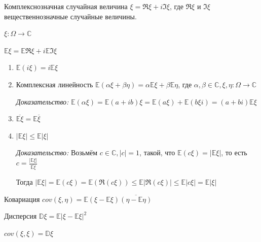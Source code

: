
\begin{definition}
    Комплекснозначная случайная величина $\xi = \Re \xi + i \Im \xi$, где $\Re \xi$ и $\Im \xi$
    вещественнозначные случайные величины.
\end{definition}

\begin{definition}
    $\xi : \Omega \to \mathbb{C}$

    $\mathbb{E} \xi = \mathbb{E} \Re \xi + i \mathbb{E} \Im \xi$
\end{definition}

\begin{properties}
    \begin{enumerate}
        \item {
            $\mathbb{E} (i \xi) = i \mathbb{E}\xi$
        }
        \item {
            Комплексная линейность $\mathbb{E} (\alpha \xi + \beta \eta) = \alpha \mathbb{E} \xi + \beta \mathbb{E} \eta$, где $\alpha, \beta \in \mathbb{C}, \xi, \eta : \Omega \to \mathbb{C}$

            \textit{Доказательство: } $\mathbb{E} (\alpha \xi) = \mathbb{E} (a + ib)\xi = \mathbb{E} (a \xi) + \mathbb{E} (b\xi i) = (a + bi) \mathbb{E} \xi$
        }
        \item {
            $\overline{\mathbb{E} \xi} = \mathbb{E} \overline{\xi}$
        }
        \item {
            $|\mathbb{E} \xi | \leqslant \mathbb{E} |\xi|$

            \textit{Доказательство: } Возьмём $c \in \mathbb{C}, |c| = 1$, такой, что $\mathbb{E} (c \xi) = |\mathbb{E} \xi|$, то есть $c = \frac{|\mathbb{E} \xi|}{\overline{\mathbb{E} \xi}}$

            Тогда $|\mathbb{E} \xi| = \mathbb{E} (c \xi) = \mathbb{E} (\Re (c \xi)) \leqslant \mathbb{E} |\Re (c \xi)| \leqslant \mathbb{E} |c \xi | = \mathbb{E} |\xi|$
        }
    \end{enumerate}
\end{properties}

\begin{definition}
    Ковариация $cov(\xi, \eta) = \mathbb{E} (\xi - \mathbb{E}\xi)\overline{(\eta - \mathbb{E} \eta)}$
\end{definition}

\begin{definition}
    Дисперсия $\mathbb{D} \xi = \mathbb{E} |\xi - \mathbb{E}\xi|^2$

    $cov(\xi, \xi) = \mathbb{D}\xi$
\end{definition}


